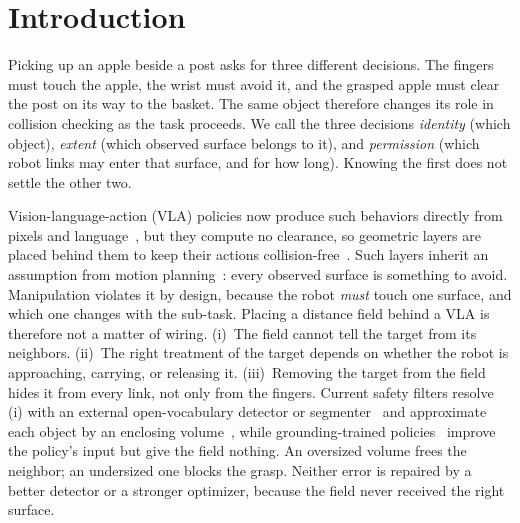 \section{Introduction}
\label{sec:intro}
Picking up an apple beside a post asks for three different decisions. The fingers must touch the apple, the wrist must avoid it, and the grasped apple must clear the post on its way to the basket. The same object therefore changes its role in collision checking as the task proceeds. We call the three decisions \emph{identity} (which object), \emph{extent} (which observed surface belongs to it), and \emph{permission} (which robot links may enter that surface, and for how long). Knowing the first does not settle the other two.

Vision-language-action (VLA) policies now produce such behaviors directly from pixels and language~\cite{brohan2023rt1,zitkovich2023rt2,kim2024openvla,black2024pi0,intelligence2025pi05}, but they compute no clearance, so geometric layers are placed behind them to keep their actions collision-free~\cite{wu2025momanipvla,hu2026vlsa,park2026knows}. Such layers inherit an assumption from motion planning~\cite{khatib1986potential,ratliff2009chomp,schulman2014trajopt}: every observed surface is something to avoid. Manipulation violates it by design, because the robot \emph{must} touch one surface, and which one changes with the sub-task. Placing a distance field behind a VLA is therefore not a matter of wiring. (i)~The field cannot tell the target from its neighbors. (ii)~The right treatment of the target depends on whether the robot is approaching, carrying, or releasing it. (iii)~Removing the target from the field hides it from every link, not only from the fingers. Current safety filters resolve (i) with an external open-vocabulary detector or segmenter~\cite{liu2024groundingdino,kirillov2023sam,wang2025yoloe} and approximate each object by an enclosing volume~\cite{hu2026vlsa,park2026knows}, while grounding-trained policies~\cite{huang2025roboground,vo2026obeyed} improve the policy's input but give the field nothing. An oversized volume frees the neighbor; an undersized one blocks the grasp. Neither error is repaired by a better detector or a stronger optimizer, because the field never received the right surface.

